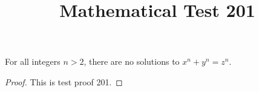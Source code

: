 \documentclass{amsart}
\begin{document}
\title{Mathematical Test 201}
\begin{theorem}
For all integers $n > 2$, there are no solutions to $x^n + y^n = z^n$.
\end{theorem}
\begin{proof}
This is test proof 201.
\end{proof}
\end{document}
